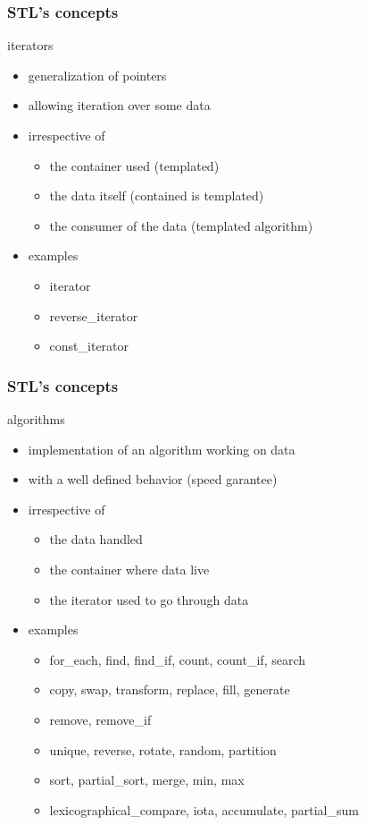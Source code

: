 \begin{frame}[fragile]
  \frametitle{STL's concepts}
  \begin{block}{iterators}
    \begin{itemize}
    \item generalization of pointers
    \item allowing iteration over some data
    \item irrespective of
      \begin{itemize}
      \item the container used (templated)
      \item the data itself (contained is templated)
      \item the consumer of the data (templated algorithm)
      \end{itemize}
    \item examples
      \begin{itemize}
      \item iterator
      \item reverse\_iterator
      \item const\_iterator
      \end{itemize}
    \end{itemize}
  \end{block}
\end{frame}

\begin{frame}[fragile]
  \frametitle{STL's concepts}
  \begin{block}{algorithms}
    \begin{itemize}
    \item implementation of an algorithm working on data
    \item with a well defined behavior (speed garantee)
    \item irrespective of
      \begin{itemize}
      \item the data handled
      \item the container where data live
      \item the iterator used to go through data
      \end{itemize}
    \item examples
      \begin{itemize}
      \item for\_each, find, find\_if, count, count\_if, search
      \item copy, swap, transform, replace, fill, generate
      \item remove, remove\_if
      \item unique, reverse, rotate, random, partition
      \item sort, partial\_sort, merge, min, max
      \item lexicographical\_compare, iota, accumulate, partial\_sum
      \end{itemize}
    \end{itemize}
  \end{block}
\end{frame}
      
